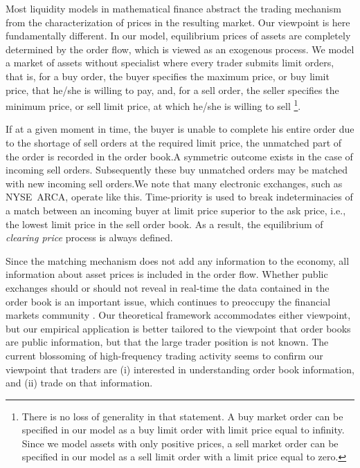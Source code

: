 \documentclass{article}
\begin{document}
Most liquidity models in mathematical finance abstract the trading mechanism
from the characterization of prices in the resulting market. Our viewpoint
is here fundamentally different. In our model, equilibrium prices of assets
are completely determined by the order flow, which is viewed as an exogenous
process. We model a market of assets without specialist where every trader
submits limit orders, that is, for a buy order, the buyer specifies the
maximum price, or buy limit price, that he/she is willing to pay, and, for a
sell order, the seller specifies the minimum price, or sell limit price, at
which he/she is willing to sell \footnote{%
There is no loss of generality in that statement. A buy market order can be
specified in our model as a buy limit order with limit price equal to
infinity. Since we model assets with only positive prices, a sell market
order can be specified in our model as a sell limit order with a limit price
equal to zero.}.

If at a given moment in time, the buyer is unable to complete his entire
order due to the shortage of sell orders at the required limit price, the
unmatched part of the order is recorded in the order book.A symmetric
outcome exists in the case of incoming sell orders. Subsequently these buy
unmatched orders may be matched with new incoming sell orders.We note that
many electronic exchanges, such as NYSE\ ARCA, operate like this.
Time-priority is used to break indeterminacies of a match between an
incoming buyer at limit price superior to the ask price, i.e., the lowest
limit price in the sell order book. As a result, the equilibrium of \textit{%
clearing price} process is always defined.

Since the matching mechanism does not add any information to the economy,
all information about asset prices is included in the order flow. Whether
public exchanges should or should not reveal in real-time the data contained
in the order book is an important issue, which continues to preoccupy the
financial markets community \cite{WW02}. Our theoretical framework
accommodates either viewpoint, but our empirical application is better
tailored to the viewpoint that order books are public information, but that
the large trader position is not known. The current blossoming of
high-frequency trading activity \cite{Eng00,BLT06, Hau08, BRZ} seems
to confirm our viewpoint that traders are (i) interested in understanding
order book information, and (ii) trade on that information.
\end{document}
